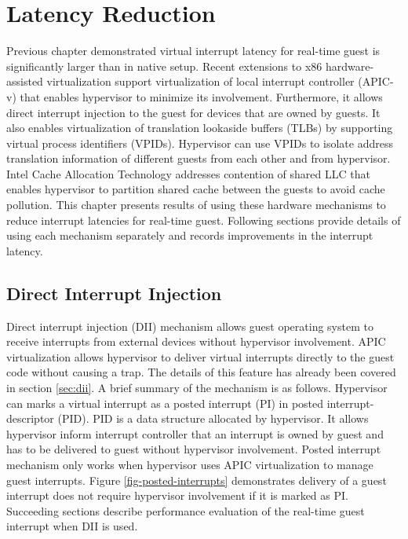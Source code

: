 \chapter{Latency Reduction\label{chap4}}

Previous chapter demonstrated virtual interrupt latency for real-time guest is significantly larger than in native setup.
Recent extensions to x86 hardware-assisted virtualization support virtualization of local interrupt controller (APIC-v) 
that enables hypervisor to minimize its involvement. Furthermore, it allows direct interrupt injection to the guest for
devices that are owned by guests. It also enables virtualization of translation lookaside buffers (TLBs) by supporting virtual
process identifiers (VPIDs). Hypervisor can use VPIDs to isolate address translation information of different guests from each other and from hypervisor.
Intel Cache Allocation Technology addresses contention of shared LLC that enables hypervisor to partition shared cache
between the guests to avoid cache pollution.
This chapter presents results of using these hardware mechanisms to reduce interrupt latencies for real-time guest.
Following sections provide details of using each mechanism separately and records improvements in the interrupt latency.


\section{Direct Interrupt Injection}
Direct interrupt injection (DII) mechanism allows guest operating system to receive interrupts from 
external devices without hypervisor involvement.
APIC virtualization allows hypervisor to deliver virtual interrupts directly to the guest code without causing a trap. 
The details of this feature has already been covered in section \ref{sec:dii}.
A brief summary of the mechanism is as follows.
Hypervisor can marks a virtual interrupt as a posted interrupt (PI) in posted interrupt-descriptor (PID). 
PID is a data structure allocated by hypervisor.
It allows hypervisor inform interrupt controller that an interrupt is owned by guest and has to be delivered to guest without hypervisor involvement. 
Posted interrupt mechanism only works when hypervisor uses APIC virtualization to manage guest interrupts. 
Figure \ref{fig-posted-interrupts} demonstrates delivery of a guest interrupt does not require hypervisor involvement if it is marked as PI.
Succeeding sections describe performance evaluation of the real-time guest interrupt when DII is used.

